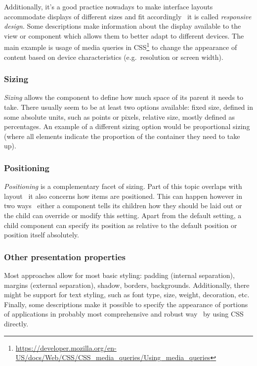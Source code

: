 Additionally, it's a good practice nowadays to make interface layouts accommodate displays of different sizes and fit accordingly \textendash\ it is called \emph{responsive design}.
Some descriptions make information about the display available to the view or component which allows them to better adapt to different devices.
The main example is usage of media queries in CSS\footnote{\url{https://developer.mozilla.org/en-US/docs/Web/CSS/CSS_media_queries/Using_media_queries}} to change the appearance of content based on device characteristics (e.g.\ resolution or screen width).

\subsubsection{Sizing}
\emph{Sizing} allows the component to define how much space of its parent it needs to take.
There usually seem to be at least two options available: fixed size, defined in some absolute units, such as points or pixels, relative size, mostly defined as percentages.
An example of a different sizing option would be proportional sizing (where all elements indicate the proportion of the container they need to take up).

\subsubsection{Positioning}
\emph{Positioning} is a complementary facet of sizing.
Part of this topic overlaps with layout \textendash\ it also concerns how items are positioned.
This can happen however in two ways \textendash\ either a component tells its children how they should be laid out or the child can override or modify this setting.
Apart from the default setting, a child component can specify its position as relative to the default position or position itself absolutely.

\subsubsection{Other presentation properties}
Most approaches allow for most basic styling: padding (internal separation), margins (external separation), shadow, borders, backgrounds.
Additionally, there might be support for text styling, such as font type, size, weight, decoration, etc.
Finally, some descriptions make it possible to specify the appearance of portions of applications in probably most comprehensive and robust way \textendash\ by using CSS directly.
